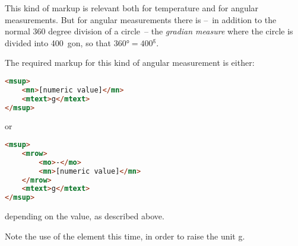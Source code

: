 \documentclass[english,a4paper,11pt]{article}
\begin{document}
\medskip
This kind of markup is relevant both for  temperature and for angular measurements. But for angular measurements there is --~in addition to the normal 360 degree division of a circle~-- the \emph{gradian measure} where the circle is divided into 400~gon, so that $\ang{360} = 400^\text{g}$.

The required markup for this kind of angular measurement is either:
\begin{lstlisting}[language=HTML]
<msup>
	<mn>[numeric value]</mn>
	<mtext>g</mtext>
</msup>
\end{lstlisting}
or
\begin{lstlisting}[language=HTML]
<msup>
	<mrow>
		<mo>-</mo>
		<mn>[numeric value]</mn>
	</mrow>
	<mtext>g</mtext>
</msup>
\end{lstlisting}
depending on the value, as described above.

Note the use of the  element this time, in order to raise the unit g.
\end{document}
